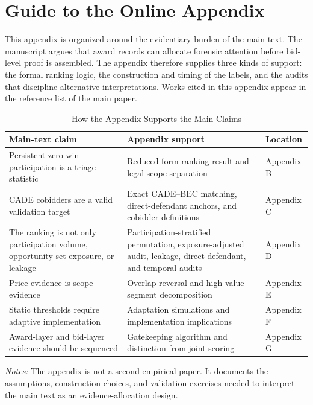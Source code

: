 \section{Guide to the Online Appendix}
\label{app:guide_submission}

This appendix is organized around the evidentiary burden of the
main text. The manuscript argues that award records can allocate
forensic attention before bid-level proof is assembled. The
appendix therefore supplies three kinds of support: the formal
ranking logic, the construction and timing of the labels, and the
audits that discipline alternative interpretations. Works cited in
this appendix appear in the reference list of the main paper.

\begin{table}[htbp]
\centering
\caption{How the Appendix Supports the Main Claims}
\label{tab:appendix_map_submission}
\footnotesize
\begin{adjustbox}{max width=\textwidth,center}
\begin{threeparttable}
\begin{tabular}{L{5.0cm}L{6.4cm}L{3.1cm}}
\toprule
Main-text claim & Appendix support & Location \\
\midrule
Persistent zero-win participation is a triage statistic &
Reduced-form ranking result and legal-scope separation &
Appendix B \\
CADE cobidders are a valid validation target &
Exact CADE--BEC matching, direct-defendant anchors, and cobidder definitions &
Appendix C \\
The ranking is not only participation volume, opportunity-set exposure, or leakage &
Participation-stratified permutation, exposure-adjusted audit, leakage, direct-defendant, and temporal audits &
Appendix D \\
Price evidence is scope evidence &
Overlap reversal and high-value segment decomposition &
Appendix E \\
Static thresholds require adaptive implementation &
Adaptation simulations and implementation implications &
Appendix F \\
Award-layer and bid-layer evidence should be sequenced &
Gatekeeping algorithm and distinction from joint scoring &
Appendix G \\
\bottomrule
\end{tabular}
\begin{tablenotes}
\footnotesize
\item \textit{Notes:} The appendix is not a second empirical
paper. It documents the assumptions, construction choices, and
validation exercises needed to interpret the main text as an
evidence-allocation design.
\end{tablenotes}
\end{threeparttable}
\end{adjustbox}
\end{table}
